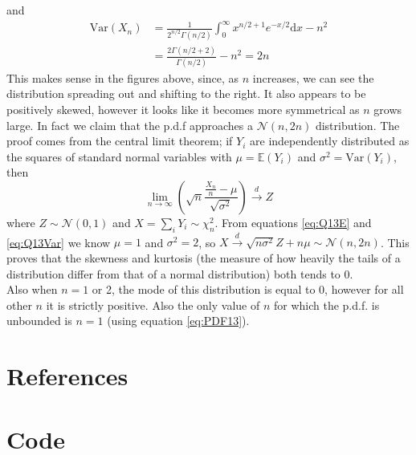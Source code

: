 \documentclass[10pt,a4paper,notitlepage]{article}
\newcommand{\Nd}{\mathcal{N}}
\newcommand{\Var}[1]{\mathrm{Var}\left(#1\right)}
\newcommand{\E}[1]{\mathbb{E}\left(#1\right)}
\begin{document}
and 
\begin{equation}\label{eq:Q13Var}
\begin{aligned}
\Var{X_{n}} &=\frac{1}{2^{n/2}\Gamma\left(n/2\right)}\int_{0}^{\infty}x^{n/2+1}e^{-x/2}\mathrm{d}x-n^{2}\\
&=\frac{2\Gamma\left(n/2+2\right)}{\Gamma\left(n/2\right)}-n^{2} = 2n
\end{aligned}
\end{equation}
This makes sense in the figures above, since, as $n$ increases, we can see the distribution spreading out and shifting to the right. It also appears to be positively skewed, however it looks like it becomes more symmetrical as $n$ grows large. In fact we claim that the p.d.f approaches a $\Nd(n,2n)$ distribution. The proof comes from the central limit theorem; if $Y_{i}$ are independently distributed as the squares of standard normal variables with $\mu=\E{Y_{i}}$ and $\sigma^{2}=\Var{Y_{i}}$, then
\begin{equation}
\lim_{n\rightarrow \infty}\left(\sqrt{n}\frac{\frac{X_{n}}{n}-\mu}{\sqrt{\sigma^{2}}}\right)\xrightarrow{d}  Z
\end{equation}
where $Z\sim \Nd(0,1)$ and $X = \sum_{i}Y_{i}\sim\chi_{n}^{2}$. From equations \eqref{eq:Q13E} and \eqref{eq:Q13Var} we know $\mu=1$ and $\sigma^{2}=2$,  so $X\xrightarrow{d} \sqrt{n\sigma^{2}}Z+n\mu\sim \Nd(n,2n)$. This proves that the skewness and kurtosis (the measure of how heavily the tails of a distribution differ from that of a normal distribution) both tends to 0.\\
Also when $n=1$ or 2, the mode of this distribution is equal to 0, however for all other $n$ it is strictly positive. Also the only value of $n$ for which the p.d.f. is unbounded is $n=1$ (using equation \eqref{eq:PDF13}).

\section*{\centering References}\label{References}
\printbibliography[heading=none]

\pagebreak
\section*{\centering Code}
\end{document}
